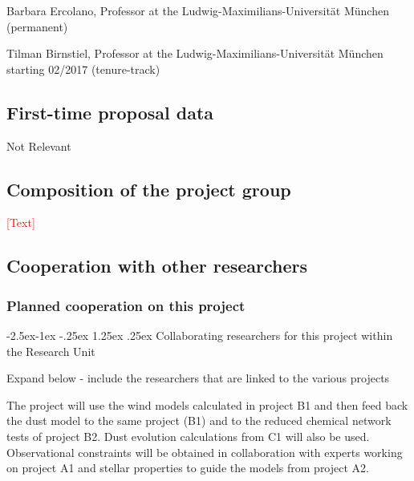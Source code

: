 \documentclass[10pt,fleqn,twoside]{article}
\makeatletter
\newcommand{\Tcol}{\color{blue}}
\renewcommand\paragraph{\@startsection{paragraph}{4}{\z@}%
            {-2.5ex\@plus -1ex \@minus -.25ex}%
            {1.25ex \@plus .25ex}%
            {\normalfont\normalsize\bfseries}}
\makeatother
\begin{document}
Barbara Ercolano, Professor at the Ludwig-Maximilians-Universit\"at
M\"unchen  (permanent)

Tilman Birnstiel, Professor at the Ludwig-Maximilians-Universit\"at M\"unchen starting 02/2017  (tenure-track)

\subsection{\Tcol First-time proposal data}

Not Relevant

\subsection{\Tcol Composition of the project group}

\textcolor{red}{[Text]}

\subsection{\Tcol Cooperation with other researchers}

\subsubsection{\Tcol Planned cooperation on this project}

\paragraph{\Tcol Collaborating researchers for this project within the
  Research Unit}

{\color{red} Expand below - include the researchers that are linked to
  the various projects}

The project will use the wind models calculated in project B1 and then
feed back the dust model to the same project (B1) and to the reduced
chemical network tests of project B2. Dust evolution calculations from C1 will also be used. Observational constraints will
be obtained in collaboration with experts working on project A1 and
stellar properties to guide the models 
from project A2. 
\end{document}
